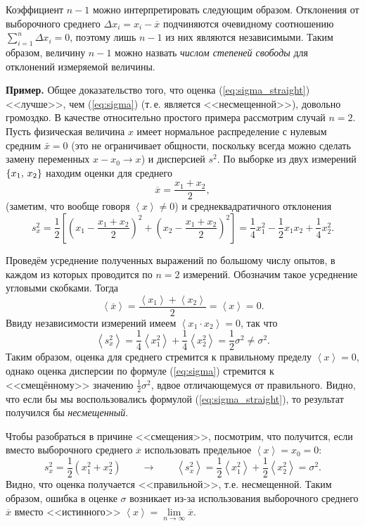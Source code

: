 \documentclass[10pt]{article}
\begin{document}
Коэффициент $n-1$ можно интерпретировать следующим образом. Отклонения
от выборочного среднего $\Delta x_{i}=x_{i}-\overline{x}$ подчиняются
очевидному соотношению $\sum\limits _{i=1}^{n}\Delta x_{i}=0$, поэтому
лишь $n-1$ из них являются независимыми. Таким образом, величину
$n-1$ можно назвать \emph{числом степеней свободы} для отклонений
измеряемой величины.

{\footnotesize
\textbf{Пример.} Общее доказательство
того, что оценка (\ref{eq:sigma_straight}) <<лучше>>,
чем (\ref{eq:sigma}) (т.\,е. является <<несмещенной>>),
довольно громоздко. В качестве относительно простого примера рассмотрим
случай $n=2$. Пусть физическая величина $x$ имеет нормальное распределение
с нулевым средним $\bar{x}=0$ (это не ограничивает общности, поскольку
всегда можно сделать замену переменных $x-x_{0}\to x$) и дисперсией
$s^{2}$. По выборке из двух измерений $\left\{ x_{1},\thinspace x_{2}\right\} $
находим оценки для среднего
\[
\overline{x}=\frac{x_{1}+x_{2}}{2},
\]
(заметим, что вообще говоря $\left\langle x\right\rangle \ne0$) и
среднеквадратичного отклонения 
\[
s_{x}^{2}=\frac{1}{2}\left[\left(x_{1}-\frac{x_{1}+x_{2}}{2}\right)^{2}+\left(x_{2}-\frac{x_{1}+x_{2}}{2}\right)^{2}\right]=\frac{1}{4}x_{1}^{2}-\frac{1}{2}x_{1}x_{2}+\frac{1}{4}x_{2}^{2}.
\]

Проведём усреднение полученных выражений по большому
числу опытов, в каждом из которых проводится по $n=2$ измерений.
Обозначим такое усреднение угловыми скобками. Тогда
\[
\left\langle \overline{x}\right\rangle =\frac{\left\langle x_{1}\right\rangle +\left\langle x_{2}\right\rangle }{2}=\left\langle x\right\rangle =0.
\]
Ввиду независимости измерений имеем $\left\langle x_{1}\cdot x_{2}\right\rangle =0$,
так что
\[
\left\langle s_{x}^{2}\right\rangle =\frac{1}{4}\left\langle x_{1}^{2}\right\rangle +\frac{1}{4}\left\langle x_{2}^{2}\right\rangle =\frac{1}{2}\sigma^{2}\ne\sigma^{2}.
\]
Таким образом, оценка для среднего стремится к правильному пределу
$\left\langle x\right\rangle =0$, однако оценка дисперсии по формуле
(\ref{eq:sigma}) стремится к <<смещённому>> значению $\frac{1}{2}\sigma^{2}$, вдвое отличающемуся от правильного.
Видно, что если бы мы воспользовались формулой (\ref{eq:sigma_straight}),
то результат получился бы 
\emph{несмещенный}.

Чтобы разобраться в причине <<смещения>>,
посмотрим, что получится, если вместо выборочного среднего $\overline{x}$
использовать предельное $\left\langle x\right\rangle =x_{0}=0$:
\[
s_{x}^{2}=\frac{1}{2}\left(x_{1}^{2}+x_{2}^{2}\right)\qquad\to\qquad\left\langle s_{x}^{2}\right\rangle =\frac{1}{2}\left\langle x_{1}^{2}\right\rangle +\frac{1}{2}\left\langle x_{2}^{2}\right\rangle =\sigma^{2}.
\]
Видно, что оценка получается <<правильной>>,
т.е. несмещенной. Таким образом, ошибка в оценке $\sigma$ возникает
из-за использования выборочного среднего $\overline{x}$ вместо <<истинного>>
$\left\langle x\right\rangle =\lim\limits_{n\to\infty}\overline{x}$.
}%
\end{document}
